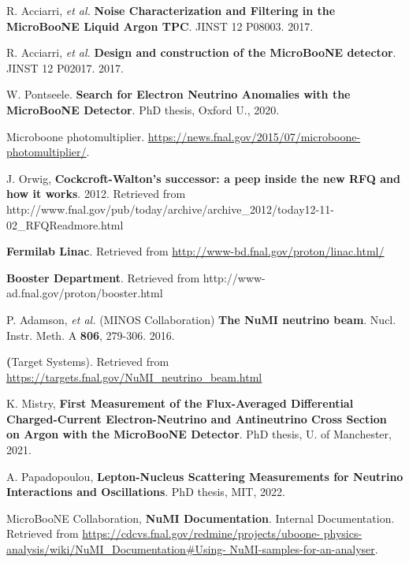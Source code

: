  R. Acciarri, \textit{et al.} \textbf{Noise Characterization and Filtering in the MicroBooNE Liquid Argon TPC}. JINST 12 P08003. 2017.

 R. Acciarri, \textit{et al.} \textbf{Design and construction of the MicroBooNE detector}. JINST 12 P02017. 2017. 

 W. Pontseele. \textbf{Search for Electron Neutrino Anomalies with the MicroBooNE Detector}. PhD thesis, Oxford U., 2020.

 Microboone photomultiplier. \href{https://news.fnal.gov/2015/07/microboone- photomultiplier/}{https://news.fnal.gov/2015/07/microboone- photomultiplier/}.

 J. Orwig, \textbf{Cockcroft-Walton's successor: a peep inside the new RFQ and how it works}. 2012. Retrieved from http://www.fnal.gov/pub/today/archive/archive\_2012/today12-11-02\_RFQReadmore.html

 \textbf{Fermilab Linac}. Retrieved from \url{http://www-bd.fnal.gov/proton/linac.html/}

 \textbf{Booster Department}. Retrieved from http://www-ad.fnal.gov/proton/booster.html

 P. Adamson, \textit{et al.} (MINOS Collaboration) \textbf{The NuMI neutrino beam}. Nucl. Instr. Meth. A \textbf{806}, 279-306. 2016.

 \textbf(Target Systems). Retrieved from \url{https://targets.fnal.gov/NuMI_neutrino_beam.html}

 K. Mistry, \textbf{First Measurement of the Flux-Averaged Differential Charged-Current Electron-Neutrino and Antineutrino Cross Section on Argon with the MicroBooNE Detector}. PhD thesis, U. of Manchester, 2021. 

 A. Papadopoulou, \textbf{Lepton-Nucleus Scattering Measurements for Neutrino Interactions and Oscillations}. PhD thesis, MIT, 2022. 

 MicroBooNE Collaboration, \textbf{NuMI Documentation}. Internal Documentation. Retrieved from \url{https://cdcvs.fnal.gov/redmine/projects/uboone- physics-analysis/wiki/NuMI_Documentation#Using- NuMI-samples-for-an-analyser}. 